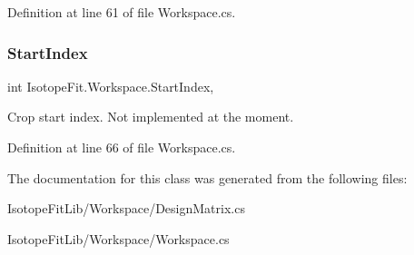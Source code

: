 Definition at line 61 of file Workspace.\+cs.

\mbox{\label{class_isotope_fit_1_1_workspace_a04248959f6df286a8f641effe0119ea0}} 
\subsubsection{\texorpdfstring{Start\+Index}{StartIndex}}
{\footnotesize\ttfamily int Isotope\+Fit.\+Workspace.\+Start\+Index\hspace{0.3cm}{\ttfamily [get]}, {\ttfamily [set]}}



Crop start index. Not implemented at the moment. 



Definition at line 66 of file Workspace.\+cs.



The documentation for this class was generated from the following files\+:\begin{DoxyCompactItemize}
\item 
Isotope\+Fit\+Lib/\+Workspace/Design\+Matrix.\+cs\item 
Isotope\+Fit\+Lib/\+Workspace/Workspace.\+cs\end{DoxyCompactItemize}
